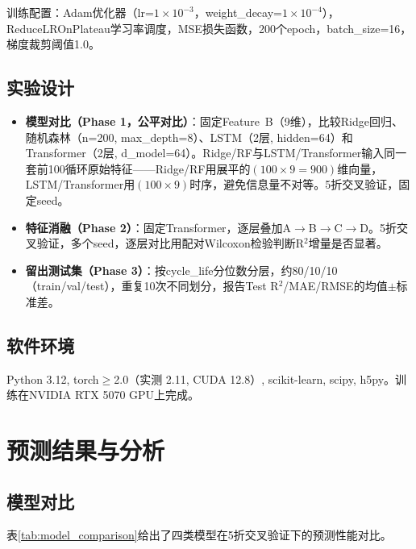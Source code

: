 \documentclass[12pt,a4paper]{ctexart}
\begin{document}
训练配置：Adam优化器（lr=$1\times10^{-3}$，weight\_decay=$1\times10^{-4}$），ReduceLROnPlateau学习率调度，MSE损失函数，200个epoch，batch\_size=16，梯度裁剪阈值1.0。

\subsection{实验设计}

\begin{itemize}[leftmargin=*]
    \item \textbf{模型对比（Phase 1，公平对比）}：固定Feature~B（9维），比较Ridge回归、随机森林（n=200, max\_depth=8）、LSTM（2层, hidden=64）和Transformer（2层, d\_model=64）。Ridge/RF与LSTM/Transformer输入同一套前100循环原始特征——Ridge/RF用展平的$(100\times9=900)$维向量，LSTM/Transformer用$(100\times9)$时序，避免信息量不对等。5折交叉验证，固定seed。
    \item \textbf{特征消融（Phase 2）}：固定Transformer，逐层叠加A$\to$B$\to$C$\to$D。5折交叉验证，多个seed，逐层对比用配对Wilcoxon检验判断R$^2$增量是否显著。
    \item \textbf{留出测试集（Phase 3）}：按cycle\_life分位数分层，约80/10/10（train/val/test），重复10次不同划分，报告Test R$^2$/MAE/RMSE的均值$\pm$标准差。
\end{itemize}

\subsection{软件环境}

Python 3.12, torch$\geq$2.0（实测 2.11, CUDA 12.8）, scikit-learn, scipy, h5py。训练在NVIDIA RTX 5070 GPU上完成。

\section{预测结果与分析}

\subsection{模型对比}

表\ref{tab:model_comparison}给出了四类模型在5折交叉验证下的预测性能对比。
\end{document}
